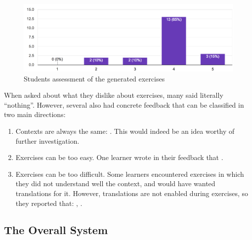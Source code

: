  \begin{figure}[h!]
    \centering
      \includegraphics[width=0.8\columnwidth]{figures/opinions/exercises_rating}
      \caption{Students assessment  of the generated exercises}
      \label{fig:ex_rating}
    \end{figure}

When asked about what they dislike about exercises, many said literally ``nothing''. However, several also had concrete feedback that can be classified in two main directions: 

\begin{enumerate}

  \item Contexts are always the same: . This would indeed be an idea worthy of further investigation.

	\item Exercises can be too easy. One learner wrote in their feedback that . 

  \item Exercises can be too difficult. Some learners encountered exercises in which they did not understand well the context, and would have wanted translations for it. However, translations are not enabled during exercises, so they reported that: , . 
	
\end{enumerate}



\subsection{The Overall System}

